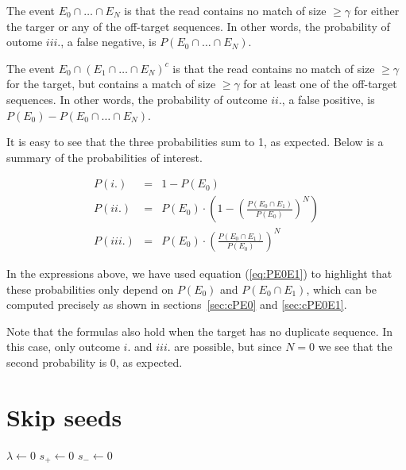 \documentclass{article}
\begin{document}
The event $E_0 \cap \ldots \cap E_N$ is that the read contains no match of
size $\geq \gamma$ for either the targer or any of the off-target
sequences. In other words, the probability of outome $iii.$, a false
negative, is $P(E_0 \cap \ldots \cap E_N)$.

The event $E_0 \cap (E_1 \cap \ldots \cap E_N)^c$ is that the read
contains no match of size $\geq \gamma$ for the target, but contains a
match of size $\geq \gamma$ for at least one of the off-target sequences.
In other words, the probability of outcome $ii.$, a false positive, is
$P(E_0) - P(E_0 \cap \ldots \cap E_N)$.

It is easy to see that the three probabilities sum to 1, as expected.
Below is a summary of the probabilities of interest.

\begin{eqnarray}
P(i.) &=& 1-P(E_0) \\
P(ii.) &=& P(E_0) \cdot \left( 1- \left( \frac{P(E_0
  \cap E_1)}{P(E_0)} \right)^N\right) \\
P(iii.) &=& P(E_0) \cdot \left( \frac{P(E_0 \cap E_1)}{P(E_0)} \right)^N
\end{eqnarray}

In the expressions above, we have used equation (\ref{eq:PE0E1}) to
highlight that these probabilities only depend on $P(E_0)$ and $P(E_0 \cap
E_1)$, which can be computed precisely as shown in sections~\ref{sec:cPE0}
and \ref{sec:cPE0E1}.

Note that the formulas also hold when the target has no duplicate
sequence. In this case, only outcome $i.$ and $iii.$ are possible, but
since $N=0$ we see that the second probability is 0, as expected.

\section{Skip seeds}


\begin{algorithm}[H]
\label{alg:mcmcskip}
\SetAlgoLined
{}
  $\lambda \leftarrow 0$ 
  $s_+ \leftarrow 0$ 
  $s_- \leftarrow 0$ 
\end{algorithm}
\end{document}
